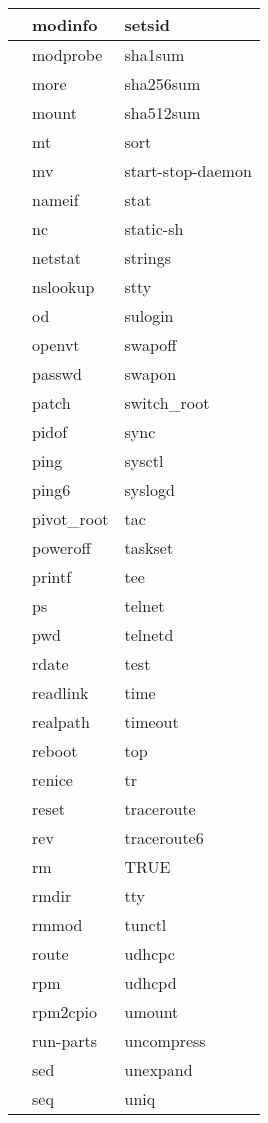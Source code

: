 \begin{longtable}{llp{50mm}}
 & modinfo & setsid \\ \hline
 & modprobe & sha1sum \\ \hline
 & more & sha256sum \\ \hline
 & mount & sha512sum \\ \hline
 & mt & sort \\ \hline
 & mv & start-stop-daemon \\ \hline
 & nameif & stat \\ \hline
 & nc & static-sh \\ \hline
 & netstat & strings \\ \hline
 & nslookup & stty \\ \hline
 & od & sulogin \\ \hline
 & openvt & swapoff \\ \hline
 & passwd & swapon \\ \hline
 & patch & switch\_root \\ \hline
 & pidof & sync \\ \hline
 & ping & sysctl \\ \hline
 & ping6 & syslogd \\ \hline
 & pivot\_root & tac \\ \hline
 & poweroff & taskset \\ \hline
 & printf & tee \\ \hline
 & ps & telnet \\ \hline
 & pwd & telnetd \\ \hline
 & rdate & test \\ \hline
 & readlink & time \\ \hline
 & realpath & timeout \\ \hline
 & reboot & top \\ \hline
 & renice & tr \\ \hline
 & reset & traceroute \\ \hline
 & rev & traceroute6 \\ \hline
 & rm & TRUE \\ \hline
 & rmdir & tty \\ \hline
 & rmmod & tunctl \\ \hline
 & route & udhcpc \\ \hline
 & rpm & udhcpd \\ \hline
 & rpm2cpio & umount \\ \hline
 & run-parts & uncompress \\ \hline
 & sed & unexpand \\ \hline
 & seq & uniq \\ \hline

\end{longtable}
